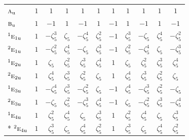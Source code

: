 \documentclass[10pt,a4paper]{article}
\numberwithin{equation}{section}
\newcommand{\irr}[1]{\text{\normalfont\scshape #1}}
\newcommand{\conjpair}[1]{{}^{#1}}
\newcommand{\ptag}[1]{\mathrm{#1}}
\newcommand{\rootunity}[1]{\zeta_{#1}}
\begin{document}
{\begin{longtable}{@{}lcccccccccc@{}}
$\irr{a}_{\ptag{u}}$ & $1$ & $1$ & $1$ & $1$ & $1$ & $1$ & $1$ & $1$ & $1$ & $1$\\
$\irr{b}_{\ptag{u}}$ & $1$ & $-1$ & $1$ & $-1$ & $1$ & $-1$ & $1$ & $-1$ & $1$ & $-1$\\
$\conjpair{1}\irr{e}_{1\ptag{u}}$ & $1$ & $-\rootunity{5}^{3}$ & $\rootunity{5}$ & $-\rootunity{5}^{4}$ & $\rootunity{5}^{2}$ & $-1$ & $\rootunity{5}^{3}$ & $-\rootunity{5}$ & $\rootunity{5}^{4}$ & $-\rootunity{5}^{2}$\\
$\conjpair{2}\irr{e}_{1\ptag{u}}$ & $1$ & $-\rootunity{5}^{2}$ & $\rootunity{5}^{4}$ & $-\rootunity{5}$ & $\rootunity{5}^{3}$ & $-1$ & $\rootunity{5}^{2}$ & $-\rootunity{5}^{4}$ & $\rootunity{5}$ & $-\rootunity{5}^{3}$\\
$\conjpair{1}\irr{e}_{2\ptag{u}}$ & $1$ & $\rootunity{5}$ & $\rootunity{5}^{2}$ & $\rootunity{5}^{3}$ & $\rootunity{5}^{4}$ & $1$ & $\rootunity{5}$ & $\rootunity{5}^{2}$ & $\rootunity{5}^{3}$ & $\rootunity{5}^{4}$\\
$\conjpair{2}\irr{e}_{2\ptag{u}}$ & $1$ & $\rootunity{5}^{4}$ & $\rootunity{5}^{3}$ & $\rootunity{5}^{2}$ & $\rootunity{5}$ & $1$ & $\rootunity{5}^{4}$ & $\rootunity{5}^{3}$ & $\rootunity{5}^{2}$ & $\rootunity{5}$\\
$\conjpair{1}\irr{e}_{3\ptag{u}}$ & $1$ & $-\rootunity{5}^{4}$ & $\rootunity{5}^{3}$ & $-\rootunity{5}^{2}$ & $\rootunity{5}$ & $-1$ & $\rootunity{5}^{4}$ & $-\rootunity{5}^{3}$ & $\rootunity{5}^{2}$ & $-\rootunity{5}$\\
$\conjpair{2}\irr{e}_{3\ptag{u}}$ & $1$ & $-\rootunity{5}$ & $\rootunity{5}^{2}$ & $-\rootunity{5}^{3}$ & $\rootunity{5}^{4}$ & $-1$ & $\rootunity{5}$ & $-\rootunity{5}^{2}$ & $\rootunity{5}^{3}$ & $-\rootunity{5}^{4}$\\
$\conjpair{1}\irr{e}_{4\ptag{u}}$ & $1$ & $\rootunity{5}^{2}$ & $\rootunity{5}^{4}$ & $\rootunity{5}$ & $\rootunity{5}^{3}$ & $1$ & $\rootunity{5}^{2}$ & $\rootunity{5}^{4}$ & $\rootunity{5}$ & $\rootunity{5}^{3}$\\*
$\conjpair{2}\irr{e}_{4\ptag{u}}$ & $1$ & $\rootunity{5}^{3}$ & $\rootunity{5}$ & $\rootunity{5}^{4}$ & $\rootunity{5}^{2}$ & $1$ & $\rootunity{5}^{3}$ & $\rootunity{5}$ & $\rootunity{5}^{4}$ & $\rootunity{5}^{2}$\\
\bottomrule\end{longtable}}
\end{document}
